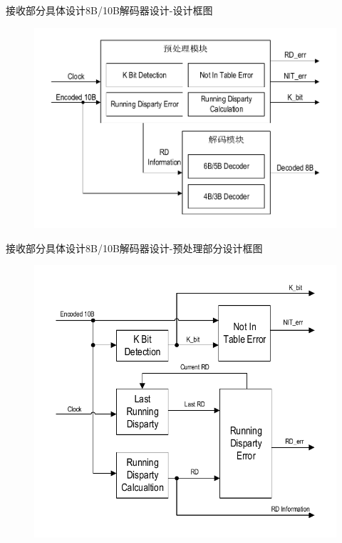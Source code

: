 \documentclass{beamer}
\begin{document}
\begin{frame}{接收部分具体设计}{8B/10B解码器设计-设计框图}
  \begin{figure}
  \centering
  \includegraphics[scale=0.6]{./img/8b10b_decoder_diagram.pdf}
  \end{figure}
\end{frame}

\begin{frame}{接收部分具体设计}{8B/10B解码器设计-预处理部分设计框图}
  \begin{figure}
  \centering
  \includegraphics[scale=0.5]{./img/8b10b_preprocess_model.pdf}
  \end{figure}
\end{frame}
\end{document}
